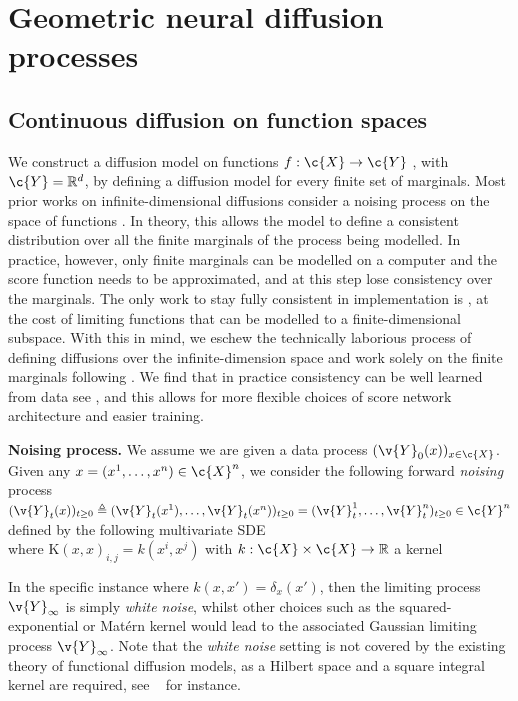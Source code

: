 \section{Geometric neural diffusion processes} \label{sec:diffusion_sp}

\subsection{Continuous diffusion on function spaces}
\label{sec:functional_diffusion}
We construct a diffusion model on functions \(f: \c{X} \rightarrow \c{Y}\) , with \(\c{Y}=\R^d\), by defining a diffusion model for every finite set of marginals.
Most prior works on infinite-dimensional diffusions consider a noising process on the space of functions \parencite{kerrigan2022Diffusion,pidstrigach2023InfiniteDimensional,lim2023score}.
In theory, this allows the model to define a consistent distribution over all the finite marginals of the process being modelled.
In practice, however, only finite marginals can be modelled on a computer and the score function needs to be approximated, and at this step lose consistency over the marginals.
The only work to stay fully consistent in implementation is \textcite{phillips2022spectral}, at the cost of limiting functions that can be modelled to a finite-dimensional subspace.
With this in mind, we eschew the technically laborious process of defining diffusions over the infinite-dimension space and work solely on the finite marginals following \textcite{dutordoir2022Neural}.
We find that in practice consistency can be well learned from data see , and this allows for more flexible choices of score network architecture and easier training.

\textbf{Noising process.}
We assume we are given a data process \((\v{Y}_0(x))_{x \in \c{X}}\).
Given any \(x=(x^1, \dots, x^n) \in \c{X}^n\), we consider the following forward \emph{noising} process \((\v{Y}_t(x))_{t \geq 0} \triangleq (\v{Y}_t(x^1),\dots,\v{Y}_t(x^n))_{t \geq 0} = (\v{Y}_t^1,\dots,\v{Y}_t^n)_{t \geq 0} \in \c{Y}^n\) defined by the following multivariate SDE \begin{equation}\label{eq:forward_SDE_sp} \end{equation} where \(\mathrm{K}(x,x)_{i,j} = k(x^i, x^j)\) with \(k:\c{X} \times \c{X} \rightarrow \R\) a kernel 

In the specific instance where \(k(x,x') = \delta_{x}(x')\), then the limiting process \(\v{Y}_\infty\) is simply \emph{white noise}, whilst other choices such as the squared-exponential or Mat\'ern kernel would lead to the associated Gaussian limiting process \(\v{Y}_\infty\).
Note that the \emph{white noise} setting is not covered by the existing theory of functional diffusion models, as a Hilbert space and a square integral kernel are required, see ~\textcite{kerrigan2022Diffusion} for instance.

